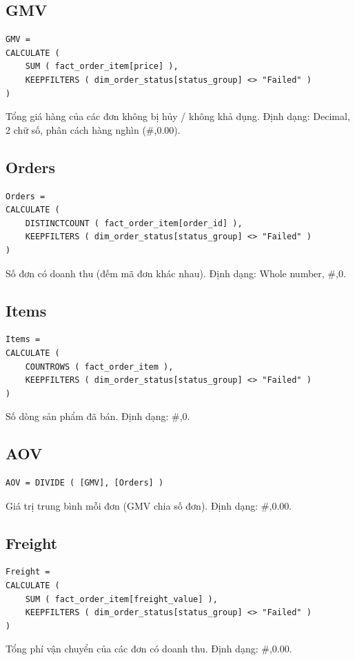 \subsection*{GMV}
\begin{lstlisting}[language={}]
GMV =
CALCULATE (
    SUM ( fact_order_item[price] ),
    KEEPFILTERS ( dim_order_status[status_group] <> "Failed" )
)
\end{lstlisting}
Tổng giá hàng của các đơn không bị hủy / không khả dụng. Định dạng: Decimal, 2 chữ số, phân cách hàng nghìn (\#,0.00).

\subsection*{Orders}
\begin{lstlisting}[language={}]
Orders =
CALCULATE (
    DISTINCTCOUNT ( fact_order_item[order_id] ),
    KEEPFILTERS ( dim_order_status[status_group] <> "Failed" )
)
\end{lstlisting}
Số đơn có doanh thu (đếm mã đơn khác nhau). Định dạng: Whole number, \#,0.

\subsection*{Items}
\begin{lstlisting}[language={}]
Items =
CALCULATE (
    COUNTROWS ( fact_order_item ),
    KEEPFILTERS ( dim_order_status[status_group] <> "Failed" )
)
\end{lstlisting}
Số dòng sản phẩm đã bán. Định dạng: \#,0.

\subsection*{AOV}
\begin{lstlisting}[language={}]
AOV = DIVIDE ( [GMV], [Orders] )
\end{lstlisting}
Giá trị trung bình mỗi đơn (GMV chia số đơn). Định dạng: \#,0.00.

\subsection*{Freight}
\begin{lstlisting}[language={}]
Freight =
CALCULATE (
    SUM ( fact_order_item[freight_value] ),
    KEEPFILTERS ( dim_order_status[status_group] <> "Failed" )
)
\end{lstlisting}
Tổng phí vận chuyển của các đơn có doanh thu. Định dạng: \#,0.00.

